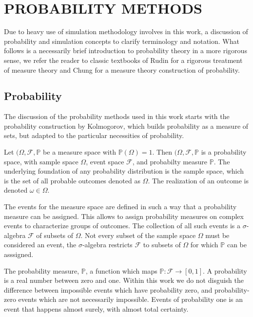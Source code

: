 \chapter{PROBABILITY METHODS}
\label{chapter:probability_methods}

Due to heavy use of simulation methodology involves in this work, a discussion of probability and simulation concepts to clarify terminology and notation.  What follows is a necessarily brief introduction to probability theory in a more rigorous sense, we refer the reader to classic textbooks of Rudin\cite{rudin1987_realanalysis} for a rigorous treatment of measure theory and Chung\cite{chung2001_probabilitytheory} for a measure theory construction of probability.

\section{Probability}
The discussion of the probability methods used in this work starts with the probability construction by Kolmogorov, which builds probability as a measure of sets, but adapted to the particular necessities of probability.

Let $(\Omega,\mathcal{F},\mathbb{P}$ be a measure space with $\mathbb{P}(\Omega)=1$.  Then $(\Omega,\mathcal{F},\mathbb{P}$ is a probability space, with sample space $\Omega$, event space $\mathcal{F}$, and probabilty measure $\mathbb{P}$.  The underlying foundation of any probability  distribution is the sample space, which is the set of all probable outcomes denoted as $\Omega$.  The realization of an outcome is denoted $\omega \in \Omega$.

The events for the measure space are defined in such a way that a probability measure can be assigned.  This allows to assign probability measures on complex events to characterize groups of outcomes.  The collection of all such events is a $\sigma$-algebra $\mathcal{F}$ of subsets of $\Omega$.  Not every subset of the sample space $\Omega$ must be considered an event, the $\sigma$-algebra restricts $\mathcal{F}$ to subsets of $\Omega$ for which $\mathbb{P}$ can be asssigned.

The probability measure, $\mathbb{P}$, a function which maps $\mathbb{P}:\mathcal{F}\rightarrow[0,1]$.  A probability is a real number between zero and one.  Within this work we do not disguish the difference between impossible events which have probability zero, and probability-zero events which are not necessarily impossible.  Events of probability one is an event that happens almost surely, with almost total certainty.

